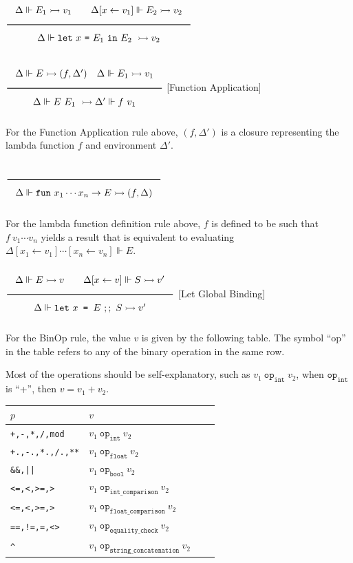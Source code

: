 \documentclass[a4paper]{article}
\newcommand{\Rule}[2]{\genfrac{}{}{0.7pt}{}{{\setlength{\fboxrule}{0pt}\setlength{\fboxsep}{3mm}\fbox{$#1$}}}{{\setlength{\fboxrule}{0pt}\setlength{\fboxsep}{3mm}\fbox{$#2$}}}}
\newcommand{\Int}{\texttt{int}}
\newcommand{\Float}{\texttt{float}}
\newcommand{\Bool}{\texttt{bool}}
\newcommand{\eval}{\rightarrowtail}
\newcommand{\under}{\Vdash}
\begin{document}
$\Rule{\Delta \under E_1 \eval v_1 \qquad \Delta[x \leftarrow v_1] \under E_2 \eval v_2}{\Delta \under \texttt{let}\ x\ \texttt{=}\ E_1\ \texttt{in}\ E_2\ \eval v_2}$

$\Rule{\Delta \under E \eval (f, \Delta') \quad \Delta \under E_1 \eval v_1}
{\Delta \under E\ E_1\ \eval \Delta' \under f\ v_1}$ [Function Application]

For the Function Application rule above, $(f, \Delta')$ is a closure representing the lambda function $f$ and environment $\Delta'$.

$\Rule{}{\Delta \under \texttt{fun}\ x_1 \cdots x_n \rightarrow E \eval (f, \Delta)}$

For the lambda function definition rule above, $f$ is defined to be such that $f\ v_1 \cdots v_n$ yields a result that is
equivalent to evaluating $\Delta[x_1 \leftarrow v_1] \cdots [x_n \leftarrow v_n] \under E$.

$\Rule{\Delta \under E \eval v \qquad \Delta[x \leftarrow v] \under S \eval v'}
{\Delta \under \texttt{let}\ x \texttt{ = } E\ ;;\ S \eval v'}$ [Let Global Binding]

For the BinOp rule, the value $v$ is given by the following table.
The symbol ``op'' in the table refers to any of the binary operation in the same row.

Most of the operations should be self-explanatory, such as $v_1\ \texttt{op}_{\Int}\ v_2$, when $\texttt{op}_{\Int}$ is ``+'', then $v = v_1 + v_2$.

\begin{tabular}{|l||l|l|l|} \hline
$p$ & $v$ \\ \hline \hline
\verb#+,-,*,/,mod# & $v_1\ \texttt{op}_{\Int}\ v_2$ \\ \hline
\verb#+.,-.,*.,/.,**# & $v_1\ \texttt{op}_{\Float}\ v_2$ \\ \hline
\verb#&&,||#  & $v_1\ \texttt{op}_{\Bool}\ v_2$ \\ \hline
\verb#<=,<,>=,># & $v_1\ \texttt{op}_{\Int \_ \texttt{comparison}}\ v_2$ \\ \hline
\verb#<=,<,>=,># & $v_1\ \texttt{op}_{\Float \_ \texttt{comparison}}\ v_2$  \\ \hline
\verb#==,!=,=,<># & $v_1\ \texttt{op}_{\texttt{equality\_check}}\ v_2$ \\ \hline
\verb#^# & $v_1\ \texttt{op}_{\texttt{string\_concatenation}}\ v_2$ \\ \hline
\end{tabular}
\vspace{3mm}
\end{document}
